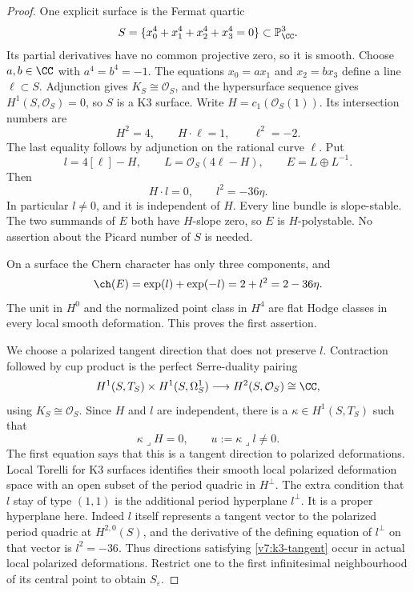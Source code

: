 \begin{proof}
One explicit surface is the Fermat quartic
\[
 S=\{x_0^4+x_1^4+x_2^4+x_3^4=0\}\subset\mathbb P^3_{\CC}.
\]
Its partial derivatives have no common projective zero, so it is smooth.
Choose $a,b\in\CC$ with $a^4=b^4=-1$.  The equations
$x_0=ax_1$ and $x_2=bx_3$ define a line $\ell\subset S$.
Adjunction gives $K_S\cong\mathcal O_S$, and the hypersurface sequence
gives $H^1(S,\mathcal O_S)=0$, so $S$ is a K3 surface.
Write $H=c_1(\mathcal O_S(1))$.  Its intersection numbers are
\[
 H^2=4,\qquad H\cdot\ell=1,\qquad\ell^2=-2.
\]
The last equality follows by adjunction on the rational curve $\ell$.
Put
\begin{equation}\label{v7:k3-line-class}
 l=4[\ell]-H,\qquad L=\mathcal O_S(4\ell-H),\qquad
 E=L\oplus L^{-1}.
\end{equation}
Then
\begin{equation}\label{v7:k3-intersections}
 H\cdot l=0,\qquad l^2=-36\eta.
\end{equation}
In particular $l\ne0$, and it is independent of $H$.
Every line bundle is slope-stable.  The two summands of $E$ both have
$H$-slope zero, so $E$ is $H$-polystable.  No assertion about the Picard
number of $S$ is needed.

On a surface the Chern character has only three components, and
\[
 \ch(E)=\exp(l)+\exp(-l)=2+l^2=2-36\eta.
\]
The unit in $H^0$ and the normalized point class in $H^4$ are flat
Hodge classes in every local smooth deformation.  This proves the
first assertion.

We choose a polarized tangent direction that does not preserve $l$.
Contraction followed by cup product is the perfect Serre-duality pairing
\[
 H^1(S,T_S)\times H^1(S,\Omega_S^1)
       \longrightarrow H^2(S,\mathcal O_S)\cong\CC,
\]
using $K_S\cong\mathcal O_S$.  Since $H$ and $l$ are independent, there
is a $\kappa\in H^1(S,T_S)$ such that
\begin{equation}\label{v7:k3-tangent}
 \kappa\lrcorner H=0,\qquad
 u:=\kappa\lrcorner l\ne0.
\end{equation}
The first equation says that this is a tangent direction to polarized
deformations.  Local Torelli for K3 surfaces \cite[Theorem~5.7]{LP80} identifies their smooth
local polarized deformation space with an open subset of the period
quadric in $H^{\perp}$.  The extra condition that $l$ stay of type
$(1,1)$ is the additional period hyperplane $l^{\perp}$.
It is a proper hyperplane here.  Indeed $l$ itself represents a tangent
vector to the polarized period quadric at $H^{2,0}(S)$, and the derivative
of the defining equation of $l^{\perp}$ on that vector is $l^2=-36$.
Thus directions satisfying \eqref{v7:k3-tangent} occur in actual local
polarized deformations.  Restrict one to the first infinitesimal
neighbourhood of its central point to obtain $S_{\varepsilon}$.


\end{proof}
